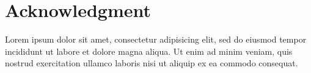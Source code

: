\documentclass[a4paper,conference]{IEEEtran}
\begin{document}
\section*{Acknowledgment}

Lorem ipsum dolor sit amet, consectetur adipisicing elit, sed do eiusmod tempor incididunt ut labore et dolore magna aliqua. Ut enim ad minim veniam, quis nostrud exercitation ullamco laboris nisi ut aliquip ex ea commodo consequat.

\






\end{document}
